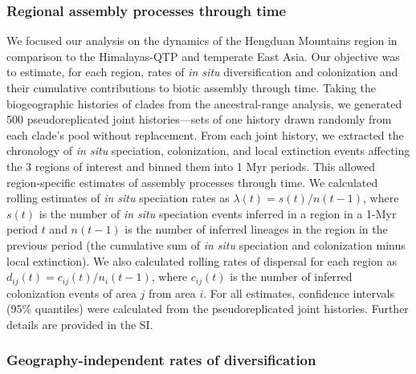 \subsubsection{Regional assembly processes through time}

We focused our analysis on the dynamics of the Hengduan Mountains region in comparison to the Himalayas-QTP and temperate East Asia. Our objective was to estimate, for each region, rates of \textit{in situ} diversification and colonization and their cumulative contributions to biotic assembly through time. Taking the biogeographic histories of clades from the ancestral-range analysis, we generated 500 pseudoreplicated joint histories---sets of one history drawn randomly from each clade's pool without replacement. From each joint history, we extracted the chronology of \textit{in situ} speciation, colonization, and local extinction events affecting the 3 regions of interest and binned them into 1 Myr periods. This allowed region-specific estimates of assembly processes through time. We calculated rolling estimates of \textit{in situ} speciation rates as $\lambda(t) = s(t)/n(t-1)$, where $s(t)$ is the number of \textit{in situ} speciation events inferred in a region in a 1-Myr period $t$ and $n(t-1)$ is the number of inferred lineages in the region in the previous period (the cumulative sum of \textit{in situ} speciation and colonization minus local extinction). We also calculated rolling rates of dispersal for each region as $d_{ij}(t) = c_{ij}(t)/n_i(t-1)$, where $c_{ij}(t)$ is the number of inferred colonization events of area $j$ from area $i$. For all estimates, confidence intervals (95\% quantiles) were calculated from the pseudoreplicated joint histories. Further details are provided in the SI.

\subsubsection{Geography-independent rates of diversification}

